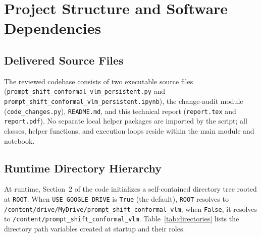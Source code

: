 \documentclass[11pt,a4paper]{article}
\begin{document}
\section{Project Structure and Software Dependencies}
\label{sec:structure}

\subsection{Delivered Source Files}
The reviewed codebase consists of two executable source files (\texttt{prompt\_\allowbreak{}shift\_\allowbreak{}conformal\_\allowbreak{}vlm\_\allowbreak{}persistent.py} and \texttt{prompt\_\allowbreak{}shift\_\allowbreak{}conformal\_\allowbreak{}vlm\_\allowbreak{}persistent.ipynb}), the change-audit module (\texttt{code\_\allowbreak{}changes.py}), \texttt{README.md}, and this technical report (\texttt{report.tex} and \texttt{report.pdf}). No separate local helper packages are imported by the script; all classes, helper functions, and execution loops reside within the main module and notebook.

\subsection{Runtime Directory Hierarchy}
At runtime, Section~2 of the code initializes a self-contained directory tree rooted at \texttt{ROOT}. When \texttt{USE\_\allowbreak{}GOOGLE\_\allowbreak{}DRIVE} is \texttt{True} (the default), \texttt{ROOT} resolves to \texttt{/\allowbreak{}content/\allowbreak{}drive/\allowbreak{}MyDrive/\allowbreak{}prompt\_\allowbreak{}shift\_\allowbreak{}conformal\_\allowbreak{}vlm}; when \texttt{False}, it resolves to \texttt{/\allowbreak{}content/\allowbreak{}prompt\_\allowbreak{}shift\_\allowbreak{}conformal\_\allowbreak{}vlm}. Table~\ref{tab:directories} lists the directory path variables created at startup and their roles.
\end{document}
